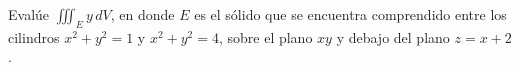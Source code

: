 \item Evalúe $\iiint_E y \, dV$, en donde $E$ es el sólido que se encuentra comprendido entre los cilindros $x^2 + y^2 = 1$ y $x^2 + y^2 = 4$, sobre el plano $xy$ y debajo del plano $z = x + 2$.
